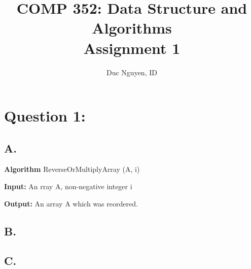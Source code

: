 \documentclass{article}
\title{COMP 352: Data Structure and Algorithms
	\\ Assignment 1}
\author{Duc Nguyen, ID\: 40064649}
\date{}
\begin{document}
	\maketitle
	\section*{\textbf{Question 1:}}
		\subsection*{A.}
		\textbf {Algorithm }  {ReverseOrMultiplyArray (A, i)} 

			\textbf{Input:} An rray A, non-negative integer i 

			\textbf{Output:} An array A which was reordered.

		\subsection*{B.}
		\subsection*{C.}
\end{document}
